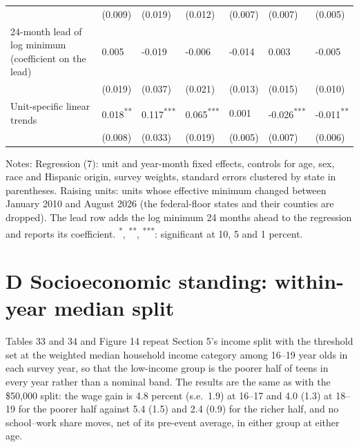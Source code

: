 \documentclass[12pt]{article}
\begin{document}
\begin{table}
\begin{tabular}{p{}p{}p{}p{}p{}p{}p{}}
 & (0.009) & (0.019) & (0.012) & (0.007) & (0.007) & (0.005) \\
24-month lead of log minimum (coefficient on the lead) & 0.005 & -0.019 & -0.006 & -0.014 & 0.003 & -0.005 \\
 & (0.019) & (0.037) & (0.021) & (0.013) & (0.015) & (0.010) \\
Unit-specific linear trends & 0.018\textsuperscript{**} & 0.117\textsuperscript{***} & 0.065\textsuperscript{***} & 0.001 & -0.026\textsuperscript{***} & -0.011\textsuperscript{**} \\
 & (0.008) & (0.033) & (0.019) & (0.005) & (0.007) & (0.006) \\
\bottomrule
\end{tabular}



\noindent\small Notes: Regression (7): unit and year-month fixed effects, controls for age, sex, race and Hispanic origin, survey weights, standard errors clustered by state in parentheses. Raising units: units whose effective minimum changed between January 2010 and August 2026 (the federal-floor states and their counties are dropped). The lead row adds the log minimum 24 months ahead to the regression and reports its coefficient. \textsuperscript{*}, \textsuperscript{**}, \textsuperscript{***}: significant at 10, 5 and 1 percent.

\end{table}

\section{D Socioeconomic standing: within-year median split}

Tables 33 and 34 and Figure 14 repeat Section 5's income split with the threshold set at the weighted median household income category among 16--19 year olds in each survey year, so that the low-income group is the poorer half of teens in every year rather than a nominal band. The results are the same as with the \$50,000 split: the wage gain is 4.8 percent (s.e.\ 1.9) at 16--17 and 4.0 (1.3) at 18--19 for the poorer half against 5.4 (1.5) and 2.4 (0.9) for the richer half, and no school--work share moves, net of its pre-event average, in either group at either age.
\end{document}
